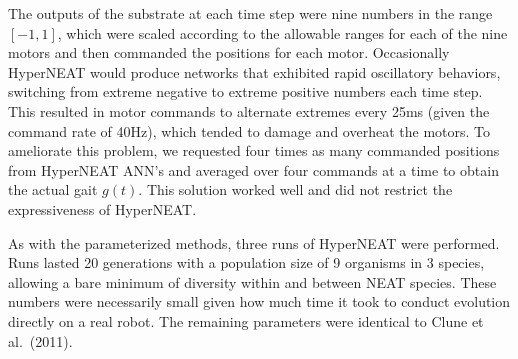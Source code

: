 
The outputs of the substrate at each time step were nine numbers in
the range $[-1,1]$, which were scaled according to the allowable
ranges for each of the nine motors and then commanded
the positions for each motor.  Occasionally HyperNEAT would produce networks that
exhibited rapid oscillatory behaviors, switching from extreme negative to extreme positive numbers each time step.  This resulted in motor
commands to alternate extremes every 25ms (given the command rate of
40Hz), which tended to damage and overheat the motors.  To ameliorate
this problem, we requested four times as many commanded
positions from HyperNEAT ANN's and averaged over four commands at a time to
obtain the actual gait $g(t)$.  This solution worked well and did not restrict the expressiveness of HyperNEAT.

As with the parameterized methods, three runs of HyperNEAT were
performed. Runs lasted 20 generations with a population size of 9
organisms in 3 species, allowing a bare minimum of diversity
within and between NEAT species.  These numbers were
necessarily small given how much time it took to conduct
evolution directly on a real robot. The remaining parameters were
identical to Clune et al.~(2011).
  


